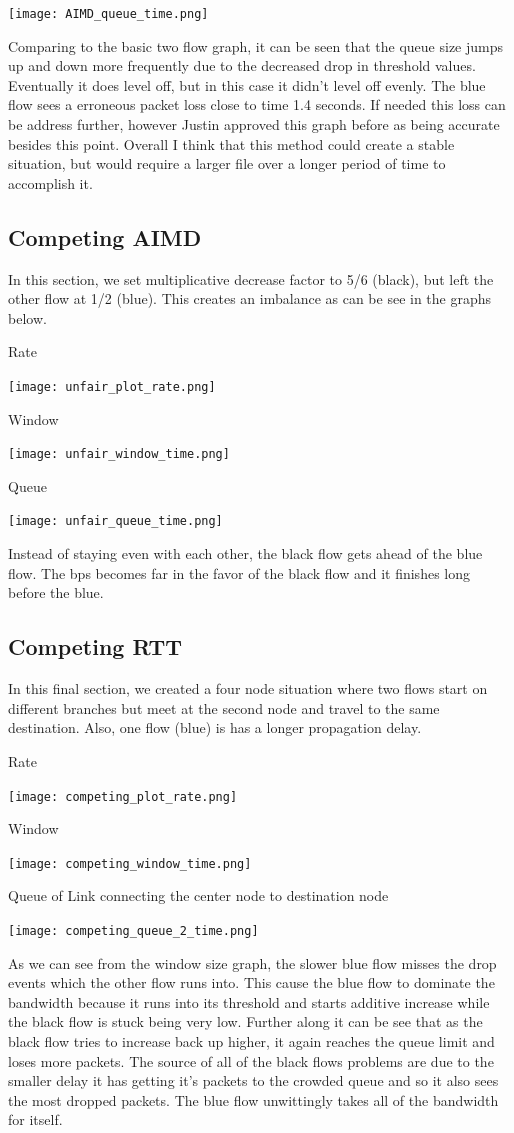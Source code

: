 \documentclass[11pt]{article}
\begin{document}
\centerline{\texttt{[image: AIMD\_queue\_time.png]}}

Comparing to the basic two flow graph, it can be seen that the queue size jumps up and down more frequently due to the decreased drop in threshold values. Eventually it does level off, but in this case it didn't level off evenly. The blue flow sees a erroneous packet loss close to time 1.4 seconds. If needed this loss can be address further, however Justin approved this graph before as being accurate besides this point. Overall I think that this method could create a stable situation, but would require a larger file over a longer period of time to accomplish it. 

\subsection{Competing AIMD}
In this section, we set multiplicative decrease factor to 5/6 (black), but left the other flow at 1/2 (blue). This creates an imbalance as can be see in the graphs below.

Rate

\centerline{\texttt{[image: unfair\_plot\_rate.png]}}

Window

\centerline{\texttt{[image: unfair\_window\_time.png]}}

Queue

\centerline{\texttt{[image: unfair\_queue\_time.png]}}

Instead of staying even with each other, the black flow gets ahead of the blue flow. The bps becomes far in the favor of the black flow and it finishes long before the blue. 

\subsection{Competing RTT}
In this final section, we created a four node situation where two flows start on different branches but meet at the second node and travel to the same destination. Also, one flow (blue) is has a longer propagation delay. 

Rate

\centerline{\texttt{[image: competing\_plot\_rate.png]}}

Window

\centerline{\texttt{[image: competing\_window\_time.png]}}

Queue of Link  connecting the center node to destination node

\centerline{\texttt{[image: competing\_queue\_2\_time.png]}}

As we can see from the window size graph, the slower blue flow misses the drop events which the other flow runs into. This cause the blue flow to dominate the bandwidth because it runs into its threshold and starts additive increase while the black flow is stuck being very low. Further along it can be see that as the black flow tries to increase back up higher, it again reaches the queue limit and loses more packets. The source of all of the black flows problems are due to the smaller delay it has getting it's packets to the crowded queue and so it also sees the most dropped packets. The blue flow unwittingly takes all of the bandwidth for itself.
\end{document}
